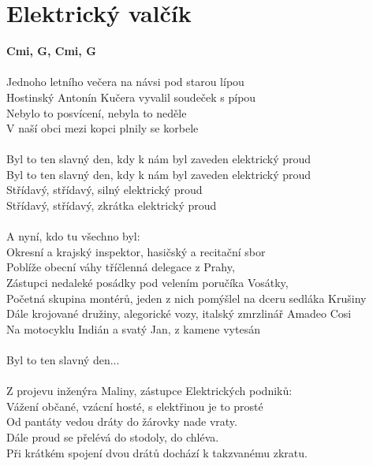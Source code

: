 \section{Elektrický valčík}
\footnotesize\textbf{Cmi, G\7, Cmi, G\7}\\
\\
\normalsize
{}Jednoho letního večera na návsi pod starou lípou\\
Hostinský Antonín Kučera vyvalil soudeček s pípou\\
Nebylo to posvícení, nebyla to neděle\\
V naší obci mezi kopci plnily se korbele\\
\\
Byl to ten slavný den, kdy k nám byl zaveden elektrický proud\\
Byl to ten slavný den, kdy k nám byl zaveden elektrický proud\\
Střídavý, střídavý,  silný elektrický proud\\
Střídavý, střídavý,  zkrátka elektrický proud\\
\\
A nyní, kdo tu všechno byl:\\
Okresní a krajský inspektor, hasičský a recitační sbor\\
Poblíže obecní váhy tříčlenná delegace z Prahy,\\
Zástupci nedaleké posádky pod velením poručíka Vosátky,\\
Početná skupina montérů, jeden z nich pomýšlel na dceru sedláka Krušiny\\
Dále krojované družiny, alegorické vozy, italský zmrzlinář Amadeo Cosi\\
Na motocyklu Indián a svatý Jan, z kamene vytesán\\
\\
Byl to ten slavný den...\\
\\
Z projevu inženýra Maliny, zástupce Elektrických podniků:\\
Vážení občané, vzácní hosté, s elektřinou je to prosté\\
Od pantáty vedou dráty do žárovky nade vraty.\\
Dále proud se přelévá do stodoly, do chléva.\\
Při krátkém spojení dvou drátů dochází k takzvanému zkratu.\\
